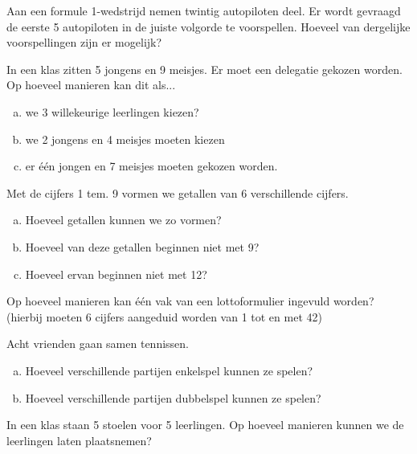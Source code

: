 \documentclass[12pt,twoside]{article}
\begin{document}
\begin{oefening}
Aan een formule 1-wedstrijd nemen twintig autopiloten deel. Er wordt gevraagd de eerste 5
autopiloten in de juiste volgorde te voorspellen. Hoeveel van dergelijke voorspellingen zijn er
mogelijk?
\end{oefening}

\begin{oefening}
In een klas zitten 5 jongens en 9 meisjes. Er moet een delegatie gekozen worden. Op hoeveel
manieren kan dit als...
\begin{enumerate}[(a)]
  \item we 3 willekeurige leerlingen kiezen?
  \item we 2 jongens en 4 meisjes moeten kiezen
  \item er één jongen en 7 meisjes moeten gekozen worden.
\end{enumerate}
\end{oefening}

\begin{oefening}
Met de cijfers 1 tem. 9 vormen we getallen van 6 verschillende cijfers.
\begin{enumerate}[(a)]
  \item Hoeveel getallen kunnen we zo vormen?
  \item Hoeveel van deze getallen beginnen niet met 9?
  \item Hoeveel ervan beginnen niet met 12?
\end{enumerate}
\end{oefening}

\begin{oefening}
Op hoeveel manieren kan één vak van een lottoformulier ingevuld worden? (hierbij
moeten 6 cijfers aangeduid worden van 1 tot en met 42)
\end{oefening}

\begin{oefening}
Acht vrienden gaan samen tennissen.
\begin{enumerate}[(a)]
  \item Hoeveel verschillende partijen enkelspel kunnen ze spelen?
  \item Hoeveel verschillende partijen dubbelspel kunnen ze spelen?
\end{enumerate}
\end{oefening}

\begin{oefening}
In een klas staan 5 stoelen voor 5 leerlingen. Op hoeveel manieren kunnen we de
leerlingen laten plaatsnemen?
\end{oefening}
\end{document}
